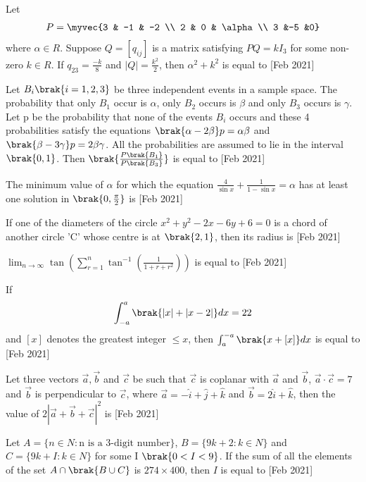 \iffalse
\title{Assignment}
\author{ee24btech11064}
\section{integer}
\fi

\item Let 
\begin{align*}
    P=\myvec{3 & -1 & -2 \\ 2 & 0 & \alpha \\ 3 &-5 &0}
\end{align*}
where $\alpha \in R$. Suppose $Q=[q_{ij}]$ is a matrix satisfying $PQ=kI_3$ for some non-zero $k\in R$. If $q_{23}=\frac{-k}{8}$ and $|Q|=\frac{k^2}{2}$, then $\alpha^2+k^2$ is equal to \hfill[Feb 2021]
\item Let $B_i \brak{i=1,2,3}$ be three independent events in a sample space. The probability that only $B_1$ occur is $\alpha$, only $B_2$ occurs is $\beta$ and only $B_3$ occurs is $\gamma$. Let p be the probability that none of the events $B_i$ occurs and these 4 probabilities satisfy the equations $\brak{\alpha-2\beta}p=\alpha\beta$ and $\brak{\beta-3\gamma}p=2\beta\gamma$. All the probabilities are assumed to lie in the interval $\brak{0,1}$. Then $\brak{\frac{P\brak{B_1}}{P\brak{B_3}}}$ is equal to \hfill[Feb 2021] 
\item The minimum value of $\alpha$ for which the equation $\frac{4}{\sin{x}}+\frac{1}{1-\sin{x}}=\alpha$ has at least one solution in $\brak{0,\frac{\pi}{2}}$ is \hfill[Feb 2021]
\item If one of the diameters of the circle $x^2+y^2-2x-6y+6=0$ is a chord of another circle 'C' whose centre is at $\brak{2,1}$, then its radius is  \hfill[Feb 2021]
\item $\lim_{n \to \infty} \tan \left( \sum_{r=1}^{n} \tan^{-1} \left( \frac{1}{1 + r + r^2} \right) \right)$ is equal to \hfill[Feb 2021]
\item If 
\begin{align*}
    \int_{-a}^{a} \brak{|x| + |x - 2|}dx = 22
\end{align*}
and $[x]$ denotes the greatest integer $\leq x$, then $\int_{a}^{-a} \brak{x+[x]}dx$ is equal to \hfill[Feb 2021]
\item Let three vectors $\vec{a},\vec{b}$ and $\vec{c}$ be such that $\vec{c}$ is coplanar with $\vec{a}$ and $\vec{b}$, $\vec{a}\cdot\vec{c}=7$ and $\vec{b}$ is perpendicular to $\vec{c}$, where $\vec{a}=-\hat{i}+\hat{j}+\hat{k}$ and $\vec{b}=2\hat{i}+\hat{k}$, then the value of $2|\vec{a}+\vec{b}+\vec{c}|^2$ is \hfill[Feb 2021]
\item Let $A=\{n\in N: \text{n is a 3-digit number}\}$, $B=\{9k+2: k\in N\}$ and $C=\{9k+I:k\in N\}$ for some I $\brak{0<I<9}$. If the sum of all the elements of the set $A\cap\brak{B\cup C}$ is $274\times400$, then $I$ is equal to \hfill[Feb 2021]

